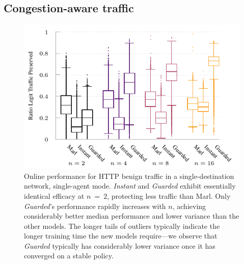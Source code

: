 \documentclass[10pt, times, comsoc]{IEEEtran}
\begin{document}
\subsection{Congestion-aware traffic}
%	
\begin{figure}
	\centering
	\includegraphics[width=0.95\linewidth]{../plots/tnsm-tcp-box-single}
	
	\caption{
		Online performance for HTTP benign traffic in a single-destination network, single-agent mode.
		\emph{Instant} and \emph{Guarded} exhibit essentially identical efficacy at $n~=~2$, protecting less traffic than Marl.
		Only \emph{Guarded}'s performance rapidly increases with $n$, achieving considerably better median performance and lower variance than the other models.
		The longer tails of outliers typically indicate the longer training time the new models require---we observe that \emph{Guarded} typically has considerably lower variance once it has converged on a stable policy.
		\label{fig:tcp-tree-box}
	}
\end{figure}
%	
\end{document}
